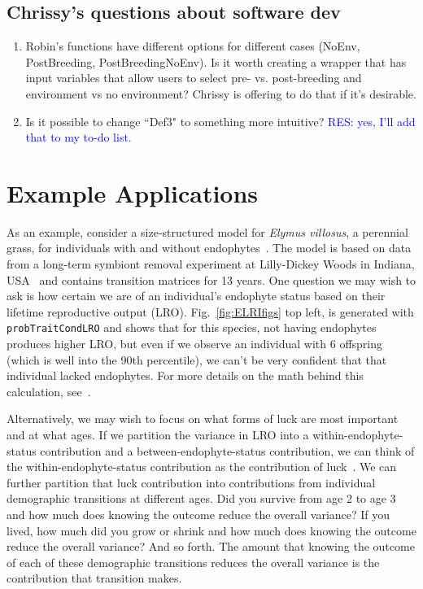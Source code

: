 \documentclass[11pt]{article}
\newcommand{\comment}{\textcolor{blue}}
\begin{document}
\begin{linenumbers}
\subsection{Chrissy's questions about software dev}
\begin{enumerate}
	\item Robin's functions have different options for different cases (NoEnv, PostBreeding, PostBreedingNoEnv). Is it worth creating a wrapper that has input variables that allow users to select pre- vs. post-breeding and environment vs no environment? Chrissy is offering to do that if it's desirable.
	\item Is it possible to change ``Def3" to something more
          intuitive? \comment{RES: yes, I'll add that to my to-do list.}
\end{enumerate}

\section{Example Applications}

As an example, consider a size-structured model for \emph{Elymus
  villosus}, a perennial grass, for individuals with and without
endophytes~\citep{2024:fowle.ziegl.whitn.ea}.  The model is based on
data from a long-term symbiont removal experiment at Lilly-Dickey
Woods in Indiana, USA~\citep{2023:mille.fowle.ziegl.ea} and contains
transition matrices for 13 years.  One question we may wish to ask is
how certain we are of an individual's endophyte status based on their
lifetime reproductive output (LRO).  Fig.~\ref{fig:ELRIfigs} top left,
is generated with \texttt{probTraitCondLRO} and shows that for this
species, not having endophytes produces higher LRO, but even if we
observe an individual with 6 offspring (which is well into the 90th
percentile), we can't be very confident that that individual lacked
endophytes.  For more details on the math behind this calculation,
see~\cite{2018:snyde.ellne,2024:snyde.ellne}.

Alternatively, we may wish to focus on what forms of luck are most
important and at what ages.  If we partition the variance in LRO into
a within-endophyte-status contribution and a between-endophyte-status
contribution, we can think of the within-endophyte-status contribution
as the contribution of luck~\citep{2018:snyde.ellne}.  We can further
partition that luck contribution into contributions from individual
demographic transitions at different ages.  Did you survive from age 2
to age 3 and how much does knowing the outcome reduce the overall
variance?  If you lived, how much did you grow or shrink and how much
does knowing the outcome reduce the overall variance?  And so forth.
The amount that knowing the outcome of each of these demographic
transitions reduces the overall variance is the contribution that
transition makes.


\end{linenumbers}
\end{document}
